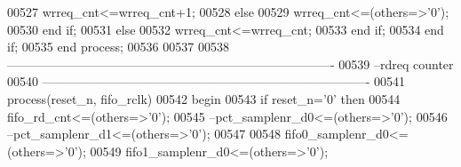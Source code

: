 \begin{DoxyCode}
00527                   \textcolor{vhdlchar}{wrreq_cnt}\textcolor{vhdlchar}{<=}\textcolor{vhdlchar}{wrreq_cnt}\textcolor{vhdlchar}{+}\textcolor{vhdllogic}{}\textcolor{vhdllogic}{1};
00528               \textcolor{keywordflow}{else} 
00529                   \textcolor{vhdlchar}{wrreq_cnt}\textcolor{vhdlchar}{<=}\textcolor{vhdlchar}{(}\textcolor{keywordflow}{others}\textcolor{vhdlchar}{=}\textcolor{vhdlchar}{>}\textcolor{vhdlchar}{'}\textcolor{vhdllogic}{}\textcolor{vhdllogic}{0}\textcolor{vhdlchar}{'}\textcolor{vhdlchar}{)};
00530               \textcolor{keywordflow}{end} \textcolor{keywordflow}{if};
00531           \textcolor{keywordflow}{else} 
00532               \textcolor{vhdlchar}{wrreq_cnt}\textcolor{vhdlchar}{<=}\textcolor{vhdlchar}{wrreq_cnt};
00533           \textcolor{keywordflow}{end} \textcolor{keywordflow}{if};
00534         \textcolor{keywordflow}{end} \textcolor{keywordflow}{if};
00535     \textcolor{keywordflow}{end} \textcolor{keywordflow}{process};
00536     
00537     
00538 \textcolor{keyword}{-------------------------------------------------------------------------------    }
00539 \textcolor{keyword}{ --rdreq counter}
00540 \textcolor{keyword}{------------------------------------------------------------------------------- }
00541   \textcolor{keywordflow}{process}(reset_n, fifo_rclk)
00542 \textcolor{vhdlkeyword}{    begin}
00543       \textcolor{keywordflow}{if} \textcolor{vhdlchar}{reset_n}\textcolor{vhdlchar}{=}\textcolor{vhdlchar}{'}\textcolor{vhdllogic}{}\textcolor{vhdllogic}{0}\textcolor{vhdlchar}{'} \textcolor{keywordflow}{then}
00544         \textcolor{vhdlchar}{fifo_rd_cnt}\textcolor{vhdlchar}{<=}\textcolor{vhdlchar}{(}\textcolor{keywordflow}{others}\textcolor{vhdlchar}{=}\textcolor{vhdlchar}{>}\textcolor{vhdlchar}{'}\textcolor{vhdllogic}{}\textcolor{vhdllogic}{0}\textcolor{vhdlchar}{'}\textcolor{vhdlchar}{)}; 
00545 \textcolor{keyword}{          --pct\_samplenr\_d0<=(others=>'0');}
00546 \textcolor{keyword}{          --pct\_samplenr\_d1<=(others=>'0');}
00547           
00548            \textcolor{vhdlchar}{fifo0_samplenr_d0}\textcolor{vhdlchar}{<=}\textcolor{vhdlchar}{(}\textcolor{keywordflow}{others}\textcolor{vhdlchar}{=}\textcolor{vhdlchar}{>}\textcolor{vhdlchar}{'}\textcolor{vhdllogic}{}\textcolor{vhdllogic}{0}\textcolor{vhdlchar}{'}\textcolor{vhdlchar}{)};
00549             \textcolor{vhdlchar}{fifo1_samplenr_d0}\textcolor{vhdlchar}{<=}\textcolor{vhdlchar}{(}\textcolor{keywordflow}{others}\textcolor{vhdlchar}{=}\textcolor{vhdlchar}{>}\textcolor{vhdlchar}{'}\textcolor{vhdllogic}{}\textcolor{vhdllogic}{0}\textcolor{vhdlchar}{'}\textcolor{vhdlchar}{)};

\end{DoxyCode}
